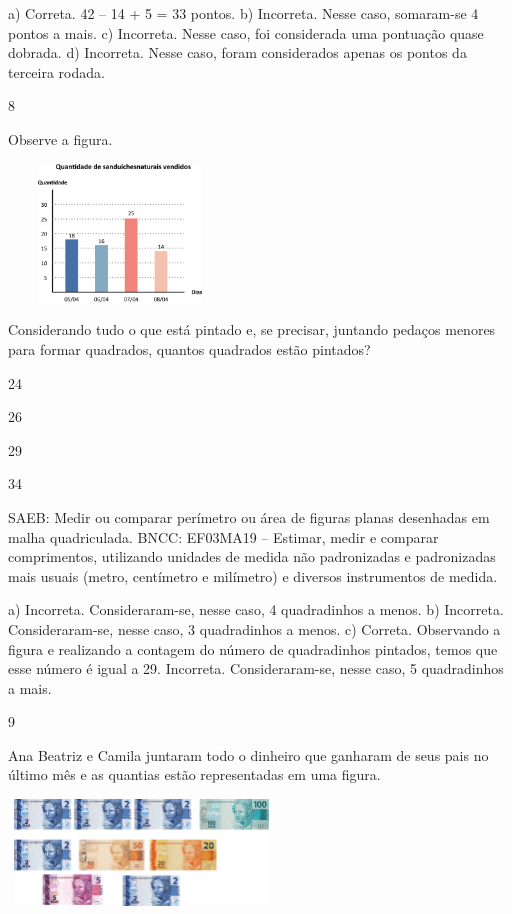 \begin{multicols}{2}
{\begin{escolha}
{a) Correta. 42 -- 14 + 5 = 33 pontos.
b) Incorreta. Nesse caso, somaram-se 4 pontos a mais.
c) Incorreta. Nesse caso, foi considerada uma pontuação quase dobrada.
d) Incorreta. Nesse caso, foram considerados apenas os pontos da terceira rodada.

\num{8}

Observe a figura.


\includegraphics[width=2.32692in,height=1.43990in]{media/image109.png}

Considerando tudo o que está pintado e, se precisar, juntando pedaços
menores para formar quadrados, quantos quadrados estão pintados?

\begin{escolha}
\item
  24
\item
  26
\item
  29
\item
  34
\end{escolha}


SAEB: Medir ou comparar perímetro ou área de figuras planas
desenhadas em malha quadriculada.
BNCC: EF03MA19 -- Estimar, medir e comparar comprimentos, utilizando unidades de medida
não padronizadas e padronizadas mais usuais (metro, centímetro e milímetro) e diversos
instrumentos de medida.

a) Incorreta. Consideraram-se, nesse caso, 4 quadradinhos a menos.
b) Incorreta. Consideraram-se, nesse caso, 3 quadradinhos a menos.
c) Correta. Observando a figura e realizando a contagem do número de quadradinhos
pintados, temos que esse número é igual a 29.
Incorreta. Consideraram-se, nesse caso, 5 quadradinhos a mais.

\num{9}

Ana Beatriz e Camila juntaram todo o dinheiro que ganharam de seus pais no
último mês e as quantias estão representadas em uma figura.


\includegraphics[width=2.77564in,height=1.11703in]{media/image110.png}

}
\end{escolha}}
\end{multicols}
